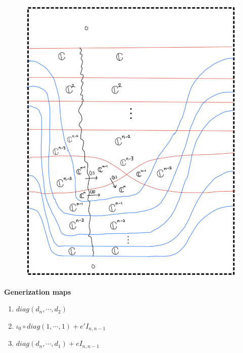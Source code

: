 \begin{enumerate}[label = (\roman*)]
\begin{enumerate}[label = (Case \arabic*)]
\begin{enumerate}[label = (Step \arabic*)]
\begin{figure}[H]
    \centering
    \includegraphics[scale = 0.95]{diagrams/cobord_gen/19.png}
    \caption{}
    \label{fig:your-label}
\end{figure}
\textbf{Generization maps}
\begin{enumerate}[label = (\arabic*)]
\item $diag(d_{n},\cdots,d_{2})$
\item $\iota_0 \circ diag(1,\cdots,1) + e' I_{n,n-1}$
\item $diag(d_{n},\cdots,d_1) + e I_{n,n-1}$
\end{enumerate}
\end{enumerate}
\end{enumerate}
\end{enumerate}